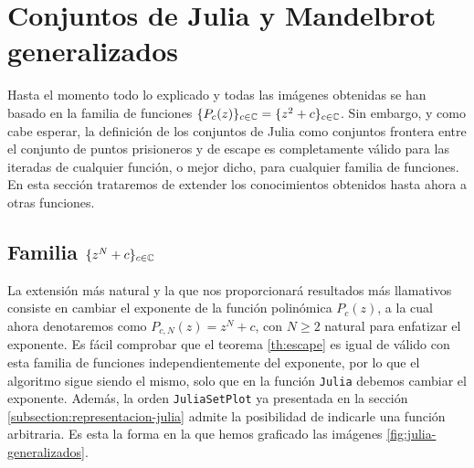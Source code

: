 \section{Conjuntos de Julia y Mandelbrot generalizados}

Hasta el momento todo lo explicado y todas las imágenes obtenidas se han basado en la familia de funciones $\{P_c(z)\}_{c\in\mathbb{C}}=\{z^2+c\}_{c\in\mathbb{C}}$. Sin embargo, y como cabe esperar, la definición de los conjuntos de Julia como conjuntos frontera entre el conjunto de puntos prisioneros y de escape es completamente válido para las iteradas de cualquier función, o mejor dicho, para cualquier familia de funciones. En esta sección trataremos de extender los conocimientos obtenidos hasta ahora a otras funciones.

\subsection{Familia $\{z^N+c\}_{c\in\mathbb{C}}$}
\label{subsection:julia-mandelbrot-generalizados}

La extensión más natural y la que nos proporcionará resultados más llamativos consiste en cambiar el exponente de la función polinómica $P_c(z)$, a la cual ahora denotaremos como $P_{c,N}(z)=z^N+c$, con $N\geq 2$ natural para enfatizar el exponente. Es fácil comprobar que el teorema \ref{th:escape} es igual de válido con esta familia de funciones independientemente del exponente, por lo que el algoritmo sigue siendo el mismo, solo que en la función \verb|Julia| debemos cambiar el exponente. Además, la orden \verb|JuliaSetPlot| ya presentada en la sección \ref{subsection:representacion-julia} admite la posibilidad de indicarle una función arbitraria. Es esta la forma en la que hemos graficado las imágenes \ref{fig:julia-generalizados}.

